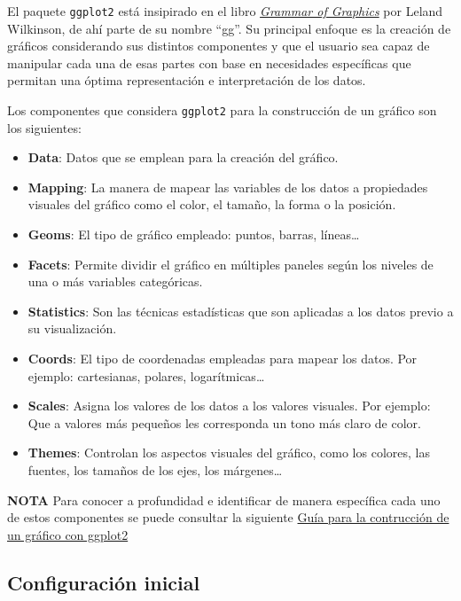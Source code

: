 \documentclass[
]{book}
\begin{document}
El paquete \texttt{ggplot2} está insipirado en el libro \href{https://link.springer.com/book/10.1007/0-387-28695-0}{\emph{Grammar of Graphics}} por Leland Wilkinson, de ahí parte de su nombre ``gg''. Su principal enfoque es la creación de gráficos considerando sus distintos componentes y que el usuario sea capaz de manipular cada una de esas partes con base en necesidades específicas que permitan una óptima representación e interpretación de los datos.

Los componentes que considera \texttt{ggplot2} para la construcción de un gráfico son los siguientes:

\begin{itemize}
\item
  \textbf{Data}: Datos que se emplean para la creación del gráfico.
\item
  \textbf{Mapping}: La manera de mapear las variables de los datos a propiedades visuales del gráfico como el color, el tamaño, la forma o la posición.
\item
  \textbf{Geoms}: El tipo de gráfico empleado: puntos, barras, líneas\ldots{}
\item
  \textbf{Facets}: Permite dividir el gráfico en múltiples paneles según los niveles de una o más variables categóricas.
\item
  \textbf{Statistics}: Son las técnicas estadísticas que son aplicadas a los datos previo a su visualización.
\item
  \textbf{Coords}: El tipo de coordenadas empleadas para mapear los datos. Por ejemplo: cartesianas, polares, logarítmicas\ldots{}
\item
  \textbf{Scales}: Asigna los valores de los datos a los valores visuales. Por ejemplo: Que a valores más pequeños les corresponda un tono más claro de color.
\item
  \textbf{Themes}: Controlan los aspectos visuales del gráfico, como los colores, las fuentes, los tamaños de los ejes, los márgenes\ldots{}
\end{itemize}

\textbf{NOTA} Para conocer a profundidad e identificar de manera específica cada uno de estos componentes se puede consultar la siguiente \href{https://intro2r.com/graphics_r.html}{Guía para la contrucción de un gráfico con ggplot2}

\subsection{Configuración inicial}\label{configuraciuxf3n-inicial}
\end{document}
